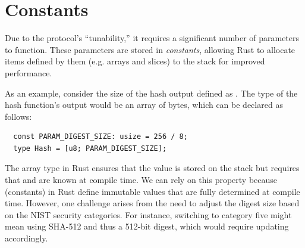 \documentclass[11pt]{report}
\theoremstyle{definition}
\theoremstyle{plain}
\begin{document}

\section{Constants}\label{sub:constants}
Due to the protocol's ``tunability,'' it requires a significant number of parameters to function. These parameters are stored in \textit{constants}, allowing Rust to allocate items defined by them (e.g. arrays and slices) to the stack for improved performance.

As an example, consider the size of the hash output defined as . The type of the hash function's output would be an array of bytes, which can be declared as follows:

\begin{verbatim}
  const PARAM_DIGEST_SIZE: usize = 256 / 8;
  type Hash = [u8; PARAM_DIGEST_SIZE];
\end{verbatim}

The \rust{[T; N]} array type in Rust ensures that the value is stored on the stack but requires that  and  are known at compile time. We can rely on this property because  (constants) in Rust define immutable values that are fully determined at compile time. However, one challenge arises from the need to adjust the digest size based on the NIST security categories. For instance, switching to category five might mean using SHA-512 and thus a 512-bit digest, which would require updating  accordingly.
\end{document}
